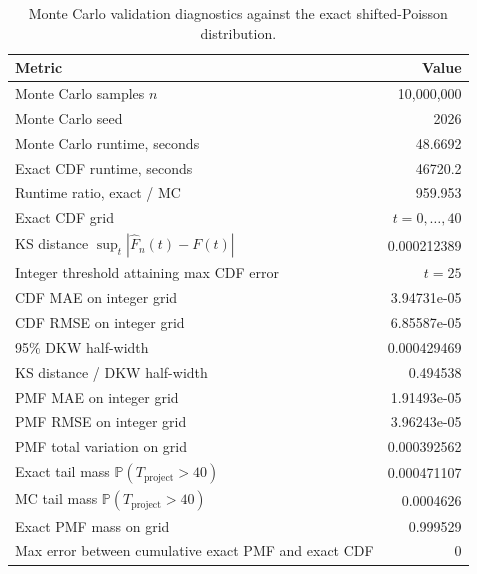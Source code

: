 \documentclass[11pt,a4paper]{article}
\newcommand{\1}{\mathbf{1}}
\theoremstyle{definition}
\theoremstyle{plain}
\theoremstyle{remark}
\numberwithin{equation}{section}
\begin{document}
\begin{table}
\centering
\caption{Monte Carlo validation diagnostics against the exact shifted-Poisson distribution.}
\label{tab:mc_validation_diagnostics}
\begin{tabular}{lr}
\toprule
Metric & Value \\
\midrule
Monte Carlo samples $n$ & 10,000,000 \\
Monte Carlo seed & 2026 \\
Monte Carlo runtime, seconds & 48.6692 \\
Exact CDF runtime, seconds & 46720.2 \\
Runtime ratio, exact / MC & 959.953 \\
Exact CDF grid & $t=0,\ldots,40$ \\
KS distance $\sup_t |\widehat F_n(t)-F(t)|$ & 0.000212389 \\
Integer threshold attaining max CDF error & $t=25$ \\
CDF MAE on integer grid & 3.94731e-05 \\
CDF RMSE on integer grid & 6.85587e-05 \\
95\% DKW half-width & 0.000429469 \\
KS distance / DKW half-width & 0.494538 \\
PMF MAE on integer grid & 1.91493e-05 \\
PMF RMSE on integer grid & 3.96243e-05 \\
PMF total variation on grid & 0.000392562 \\
Exact tail mass $\mathbb{P}(T_{\mathrm{project}}>40)$ & 0.000471107 \\
MC tail mass $\mathbb{P}(T_{\mathrm{project}}>40)$ & 0.0004626 \\
Exact PMF mass on grid & 0.999529 \\
Max error between cumulative exact PMF and exact CDF & 0 \\
\bottomrule
\end{tabular}
\end{table}
\end{document}
